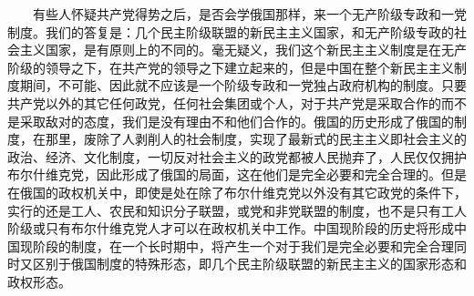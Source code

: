 \documentclass[cn,11pt,chinese]{elegantbook}
\begin{document}
　　有些人怀疑共产党得势之后，是否会学俄国那样，来一个无产阶级专政和一党制度。我们的答复是：几个民主阶级联盟的新民主主义国家，和无产阶级专政的社会主义国家，是有原则上的不同的。毫无疑义，我们这个新民主主义制度是在无产阶级的领导之下，在共产党的领导之下建立起来的，但是中国在整个新民主主义制度期间，不可能、因此就不应该是一个阶级专政和一党独占政府机构的制度。只要共产党以外的其它任何政党，任何社会集团或个人，对于共产党是采取合作的而不是采取敌对的态度，我们是没有理由不和他们合作的。俄国的历史形成了俄国的制度，在那里，废除了人剥削人的社会制度，实现了最新式的民主主义即社会主义的政治、经济、文化制度，一切反对社会主义的政党都被人民抛弃了，人民仅仅拥护布尔什维克党，因此形成了俄国的局面，这在他们是完全必要和完全合理的。但是在俄国的政权机关中，即使是处在除了布尔什维克党以外没有其它政党的条件下，实行的还是工人、农民和知识分子联盟，或党和非党联盟的制度，也不是只有工人阶级或只有布尔什维克党人才可以在政权机关中工作。中国现阶段的历史将形成中国现阶段的制度，在一个长时期中，将产生一个对于我们是完全必要和完全合理同时又区别于俄国制度的特殊形态，即几个民主阶级联盟的新民主主义的国家形态和政权形态。\\
\end{document}
